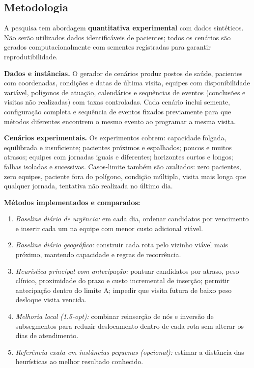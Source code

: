 \documentclass[11pt,a4paper]{article}
\providecommand{\tightlist}{%
  \setlength{\itemsep}{0pt}\setlength{\parskip}{0pt}}
\begin{document}
\subsection{Metodologia}\label{metodologia}

A pesquisa tem abordagem \textbf{quantitativa experimental} com dados
sintéticos. Não serão utilizados dados identificáveis de pacientes;
todos os cenários são gerados computacionalmente com sementes
registradas para garantir reprodutibilidade.

\textbf{Dados e instâncias.} O gerador de cenários produz postos de
saúde, pacientes com coordenadas, condições e datas de última visita,
equipes com disponibilidade variável, polígonos de atuação, calendários
e sequências de eventos (conclusões e visitas não realizadas) com taxas
controladas. Cada cenário inclui semente, configuração completa e
sequência de eventos fixados previamente para que métodos diferentes
encontrem o mesmo evento ao programar a mesma visita.

\textbf{Cenários experimentais.} Os experimentos cobrem: capacidade
folgada, equilibrada e insuficiente; pacientes próximos e espalhados;
poucos e muitos atrasos; equipes com jornadas iguais e diferentes;
horizontes curtos e longos; falhas isoladas e sucessivas. Casos-limite
também são avaliados: zero pacientes, zero equipes, paciente fora do
polígono, condição múltipla, visita mais longa que qualquer jornada,
tentativa não realizada no último dia.

\textbf{Métodos implementados e comparados:}

\begin{enumerate}
\def\labelenumi{\arabic{enumi}.}
\tightlist%
\item
  \emph{Baseline diário de urgência:} em cada dia, ordenar candidatos
  por vencimento e inserir cada um na equipe com menor custo adicional
  viável.
\item
  \emph{Baseline diário geográfico:} construir cada rota pelo vizinho
  viável mais próximo, mantendo capacidade e regras de recorrência.
\item
  \emph{Heurística principal com antecipação:} pontuar candidatos por
  atraso, peso clínico, proximidade do prazo e custo incremental de
  inserção; permitir antecipação dentro do limite A; impedir que visita
  futura de baixo peso desloque visita vencida.
\item
  \emph{Melhoria local (1.5-opt):} combinar reinserção de nós e inversão
  de subsegmentos para reduzir deslocamento dentro de cada rota sem
  alterar os dias de atendimento.
\item
  \emph{Referência exata em instâncias pequenas (opcional):} estimar a
  distância das heurísticas ao melhor resultado conhecido.
\end{enumerate}
\end{document}
